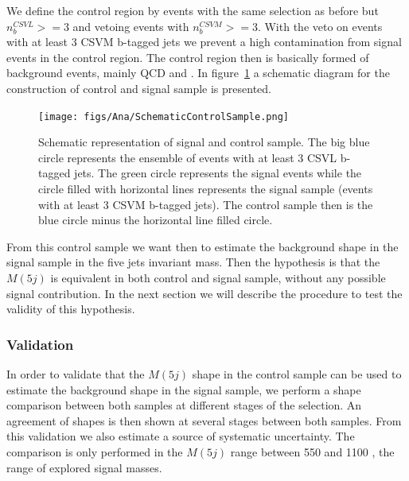 We define the control region by events with the same selection as before but $n_{b}^{CSVL}>=3$ and vetoing events with $n_{b}^{CSVM}>=3$. With the veto on events with at least 3 CSVM b-tagged jets we prevent a high contamination from signal events in the control region. The control region then is basically formed of background events, mainly QCD and \ttbar. In figure~\ref{fig:CSSSSche} a schematic diagram for the construction of control and signal sample is presented.

\begin{figure}[!Hhtbp]
  \begin{center}
    \texttt{[image: figs/Ana/SchematicControlSample.png]}
    \caption{Schematic representation of signal and control sample. The big blue circle represents the ensemble of events with at least 3 CSVL b-tagged jets. The green circle represents the signal events while the circle filled with horizontal lines represents the signal sample (events with at least 3 CSVM b-tagged jets). The control sample then is the blue circle minus the horizontal line filled circle.}
    \label{fig:CSSSSche}
  \end{center}
\end{figure}

From this control sample we want then to estimate the background shape in the signal sample in the five jets invariant mass. Then the hypothesis is that the $M(5j)$ is equivalent in both control and signal sample, without any possible signal contribution. In the next section we will describe the procedure to test the validity of this hypothesis. 

\subsubsection{Validation}
\label{sec:validation}

In order to validate that the $M(5j)$ shape in the control sample can be used to estimate the background shape in the signal sample, we perform a shape comparison between both samples at different stages of the selection. An agreement of shapes is then shown at several stages between both samples. From this validation we also estimate a source of systematic uncertainty. The comparison is only performed in the $M(5j)$ range between 550 and 1100 \GeVcc, the range of explored signal masses.

